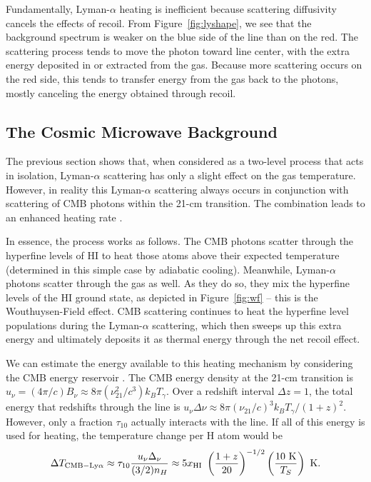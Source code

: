Fundamentally, Lyman-$\alpha$ heating is inefficient because scattering diffusivity cancels the effects of recoil.  From Figure~\ref{fig:lyshape}, we see that the background spectrum is weaker on the blue side of the line than on the red.  The scattering process tends to move the photon toward line center, with the extra energy deposited in or extracted from the gas.  Because more scattering occurs on the red side, this tends to transfer energy from the gas back to the photons, mostly canceling the energy obtained through recoil.

\subsection{The Cosmic Microwave Background} 

The previous section shows that, when considered as a two-level process that acts in isolation, Lyman-$\alpha$ scattering has only a slight effect on the gas temperature. However, in reality this Lyman-$\alpha$ scattering always occurs in conjunction with scattering of CMB photons within the 21-cm transition. The combination leads to an enhanced heating rate \cite{venumadhav18}.

In essence, the process works as follows. The CMB photons scatter through the hyperfine levels of HI to heat those atoms above their expected temperature (determined in this simple case by adiabatic cooling). Meanwhile, Lyman-$\alpha$ photons scatter through the gas as well. As they do so, they mix the hyperfine levels of the HI ground state, as depicted in Figure~\ref{fig:wf} -- this is the Wouthuysen-Field effect. CMB scattering continues to heat the hyperfine level populations during the Lyman-$\alpha$ scattering, which then sweeps up this extra energy and ultimately deposits it as thermal energy through the net recoil effect.

We can estimate the energy available to this heating mechanism by considering the CMB energy reservoir \cite{venumadhav18}. The CMB energy density at the 21-cm transition is $u_\nu = (4 \pi/c) B_\nu \approx 8 \pi (\nu_{21}^2/c^3) k_B T_\gamma$. Over a redshift interval $\Delta z=1$, the total energy that redshifts through the line is $u_\nu \Delta \nu \approx 8 \pi (\nu_{21}/c)^3 k_B T_\gamma / (1+z)^2$. However, only a fraction $\tau_{10}$ actually interacts with the line. If all of this energy is used for heating, the temperature change per H atom would be
\begin{equation}
\Delta T_{\rm CMB-Ly\alpha} \approx \tau_{10} {u_\nu \Delta_\nu \over (3/2) n_H} \approx 5 x_{\rm HI} \  \left( {1 + z \over 20} \right)^{-1/2} \left( {10 \ {\rm K} \over T_S} \right) \ {\rm K}.
\label{eq:cmb-lya-heat}
\end{equation}


